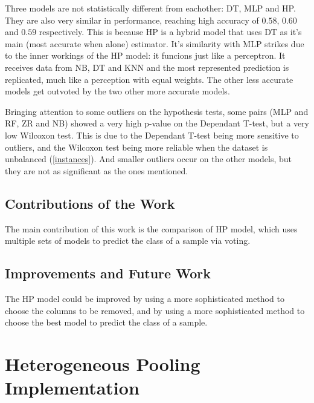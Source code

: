 \documentclass[review]{elsarticle}
\begin{document}
Three models are not statistically different from eachother: DT, MLP and HP. They are also very similar in performance, reaching high accuracy of $0.58$, $0.60$ and $0.59$ respectively. This is because HP is a hybrid model that uses DT as it's main (most accurate when alone) estimator. It's similarity with MLP strikes due to the inner workings of the HP model: it funcions just like a perceptron. It receives data from NB, DT and KNN and the most represented prediction is replicated, much like a perception with equal weights. The other less accurate models get outvoted by the two other more accurate models.

Bringing attention to some outliers on the hypothesis tests, some pairs (MLP and RF, ZR and NB) showed a very high p-value on the Dependant T-test, but a very low Wilcoxon test. This is due to the Dependant T-test being more sensitive to outliers, and the Wilcoxon test being more reliable when the dataset is unbalanced (\cref{instances}). And smaller outliers occur on the other models, but they are not as significant as the ones mentioned.

\subsection{Contributions of the Work}

The main contribution of this work is the comparison of HP model, which uses multiple sets of models to predict the class of a sample via voting.

\subsection{Improvements and Future Work}

The HP model could be improved by using a more sophisticated method to choose the columns to be removed, and by using a more sophisticated method to choose the best model to predict the class of a sample.

\appendix

\section{Heterogeneous Pooling Implementation} \label{lst:hp}
\end{document}
